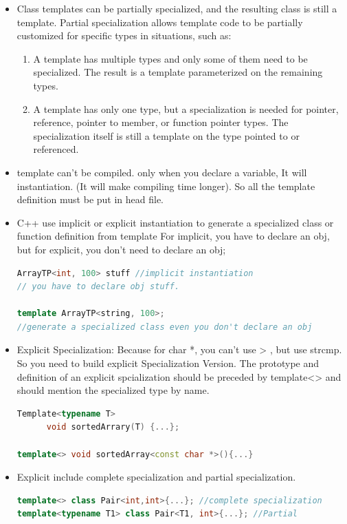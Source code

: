 \documentclass[a4paper,12pt,twoside]{book}
\begin{document}
\begin{itemize}
\item Class templates can be partially specialized, and the resulting class is still a template. Partial specialization allows template code to be partially customized for specific types in situations, such as:

\begin{enumerate}
\item A template has multiple types and only some of them need to be specialized. The result is a template parameterized on the remaining types.

\item A template has only one type, but a specialization is needed for pointer, reference, pointer to member, or function pointer types. The specialization itself is still a template on the type pointed to or referenced.
\end{enumerate}


\item template can't be compiled. only when you declare a variable, It will instantiation. (It will make compiling time longer). So all the template definition must be put in head file.

\item C++ use implicit or explicit instantiation to generate a specialized class or function definition from template
For implicit, you have to declare an obj, but for explicit, you don't need to declare an obj;
\begin{lstlisting}[frame=single, language=c++]
ArrayTP<int, 100> stuff //implicit instantiation
// you have to declare obj stuff.

template ArrayTP<string, 100>;
//generate a specialized class even you don't declare an obj
\end{lstlisting}


\item Explicit Specialization: Because for char *, you can't use > , but use strcmp.  So you need to build explicit Specialization Version. The prototype and definition of an explicit spcialization should be preceded by template<> and should mention the specialized type by name.
\begin{lstlisting}[frame=single, language=c++]
Template<typename T>
      void sortedArrary(T) {...};

template<> void sortedArray<const char *>(){...}
\end{lstlisting}


\item Explicit include complete specialization and partial specialization.
\begin{lstlisting}[frame=single, language=c++]
template<> class Pair<int,int>{...}; //complete specialization
template<typename T1> class Pair<T1, int>{...}; //Partial
\end{lstlisting}


\end{itemize}
\end{document}
